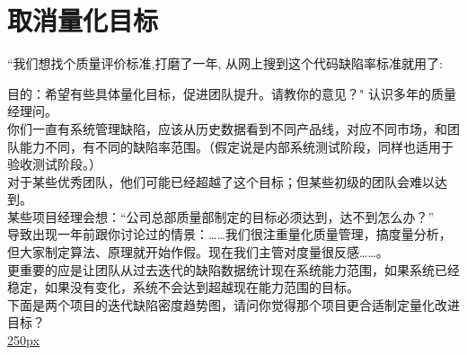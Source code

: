 \chapter{取消量化目标} %

``我们想找个质量评价标准,打磨了一年, 从网上搜到这个代码缺陷率标准就用了:


目的：希望有些具体量化目标，促进团队提升。请教你的意见？"
认识多年的质量经理问。\\
你们一直有系统管理缺陷，应该从历史数据看到不同产品线，对应不同市场，和团队能力不同，有不同的缺陷率范围。（假定说是内部系统测试阶段，同样也适用于验收测试阶段。）\\
对于某些优秀团队，他们可能已经超越了这个目标；但某些初级的团队会难以达到。\\
某些项目经理会想：``公司总部质量部制定的目标必须达到，达不到怎么办？''\\
导致出现一年前跟你讨论过的情景：\ldots{}\ldots{}我们很注重量化质量管理，搞度量分析，但大家制定算法、原理就开始作假。现在我们主管对度量很反感\ldots{}\ldots{}。\\
更重要的应是让团队从过去迭代的缺陷数据统计现在系统能力范围，如果系统已经稳定，如果没有变化，系统不会达到超越现在能力范围的目标。\\
下面是两个项目的迭代缺陷密度趋势图，请问你觉得那个项目更合适制定量化改进目标？\\
\href{文件:P10CcScreenshot_2021-09-25_104057.png}{250px}

